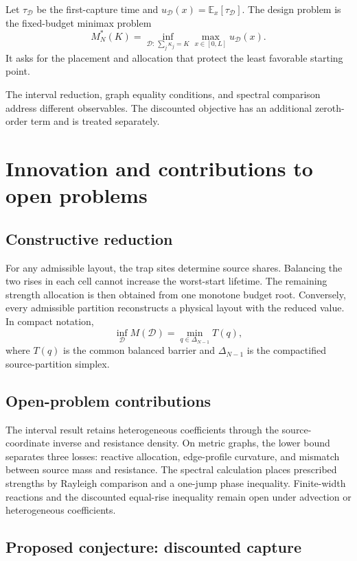 \documentclass[10pt]{article}
\newcommand{\E}{\mathbb E}
\begin{document}
Let $\tau_{\mathcal D}$ be the first-capture time and $u_{\mathcal D}(x)=\E_x[\tau_{\mathcal D}]$. The design problem is the fixed-budget minimax problem
\[
M_N^*(K)=\inf_{\mathcal D:\,\sum_j\kappa_j=K}\max_{x\in[0,L]}u_{\mathcal D}(x).
\]
It asks for the placement and allocation that protect the least favorable starting point.

The interval reduction, graph equality conditions, and spectral comparison address different observables. The discounted objective has an additional zeroth-order term and is treated separately.

\section{Innovation and contributions to open problems}

\subsection{Constructive reduction}

For any admissible layout, the trap sites determine source shares. Balancing the two rises in each cell cannot increase the worst-start lifetime. The remaining strength allocation is then obtained from one monotone budget root. Conversely, every admissible partition reconstructs a physical layout with the reduced value. In compact notation,
\[
\inf_{\mathcal D}M(\mathcal D)=\min_{q\in\Delta_{N-1}}T(q),
\]
where $T(q)$ is the common balanced barrier and $\Delta_{N-1}$ is the compactified source-partition simplex.

\subsection{Open-problem contributions}

The interval result retains heterogeneous coefficients through the source-coordinate inverse and resistance density. On metric graphs, the lower bound separates three losses: reactive allocation, edge-profile curvature, and mismatch between source mass and resistance. The spectral calculation places prescribed strengths by Rayleigh comparison and a one-jump phase inequality. Finite-width reactions and the discounted equal-rise inequality remain open under advection or heterogeneous coefficients.

\subsection{Proposed conjecture: discounted capture}
\end{document}
